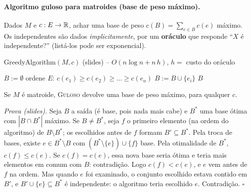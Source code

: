 \paragraph{Algoritmo guloso para matroides (base de peso máximo).} Dados $M$ e $c:E\to\mathbb{R}$, achar uma base de peso $c(B)=\sum_{e\in B}c(e)$ máximo. Os independentes são dados \emph{implicitamente}, por um \textbf{oráculo} que responde ``$X$ é independente?'' (listá-los pode ser exponencial).
\begin{pseudo}{GreedyAlgorithm$(M,c)$ (slides) -- $O(n\log n+n\,h)$, $h=$ custo do oráculo}
\begin{algorithmic}
  \State $B:=\emptyset$
  \State ordene $E$: $c(e_1)\ge c(e_2)\ge\dots\ge c(e_n)$ 
     \State $B:=B\cup\{e_i\}$ \EndIf
  \EndFor
  \State \Return $B$
\EndFunction
\end{algorithmic}
\end{pseudo}
\begin{teo}\label{teo:gulosomat}
Se $M$ é matroide, \textup{\textsc{Guloso}} devolve uma base de peso máximo, para qualquer $c$.
\end{teo}
\emph{Prova (slides).} Seja $B$ a saída (é base, pois nada mais cabe) e $B^*$ uma base ótima com $|B\cap B^*|$ máximo. Se $B\ne B^*$, seja $f$ o primeiro elemento (na ordem do algoritmo) de $B\setminus B^*$; os escolhidos antes de $f$ formam $B'\subseteq B^*$. Pela troca de bases, existe $e\in B^*\setminus B$ com $(B^*\setminus\{e\})\cup\{f\}$ base. Pela otimalidade de $B^*$, $c(f)\le c(e)$. Se $c(f)=c(e)$, essa nova base seria ótima e teria mais elementos em comum com $B$: contradição. Logo $c(f)<c(e)$, e $e$ vem antes de $f$ na ordem. Mas quando $e$ foi examinado, o conjunto escolhido estava contido em $B'$, e $B'\cup\{e\}\subseteq B^*$ é independente: o algoritmo teria escolhido $e$. Contradição. $\square$


